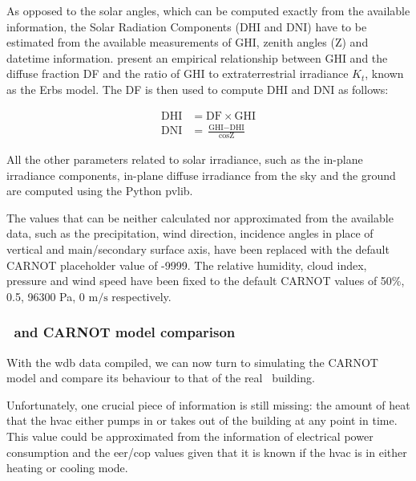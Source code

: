 As opposed to the solar angles, which can be computed exactly from the available
information, the Solar Radiation Components (DHI and DNI) have to be estimated
from the available measurements of GHI, zenith angles (Z) and datetime
information.  \textcite{erbsEstimationDiffuseRadiation1982} present an empirical
relationship between GHI and the diffuse fraction DF and the ratio of GHI to
extraterrestrial irradiance $K_t$, known as the Erbs model. The DF is then used
to compute DHI and DNI as follows:

\begin{equation}
    \begin{aligned}
        \text{DHI} &= \text{DF} \times \text{GHI} \\
        \text{DNI} &= \frac{\text{GHI} - \text{DHI}}{\cos{\text{Z}}}
    \end{aligned}
\end{equation}

All the other parameters related to solar irradiance, such as the in-plane
irradiance components, in-plane diffuse irradiance from the sky and the ground
are computed using the Python pvlib.

The values that can be neither calculated nor approximated from the available
data, such as the precipitation, wind direction, incidence angles in place of
vertical and main/secondary surface axis, have been replaced with the default
CARNOT placeholder value of -9999. The relative humidity, cloud index, pressure
and wind speed have been fixed to the default CARNOT values of 50\%, 0.5, 96300
Pa, 0 $\text{m}/\text{s}$ respectively.

\subsubsection{\pdome\ and CARNOT model comparison}\label{sec:CARNOT_comparison}

With the \acrshort{wdb} data compiled, we can now turn to simulating the CARNOT
model and compare its behaviour to that of the real \pdome\ building. 

Unfortunately, one crucial piece of information is still missing: the amount of
heat that the \acrshort{hvac} either pumps in or takes out of the building at
any point in time.  This value could be approximated from the information of
electrical power consumption and the \acrshort{eer}/\acrshort{cop} values given
that it is known if the \acrshort{hvac} is in either heating or cooling mode. 

